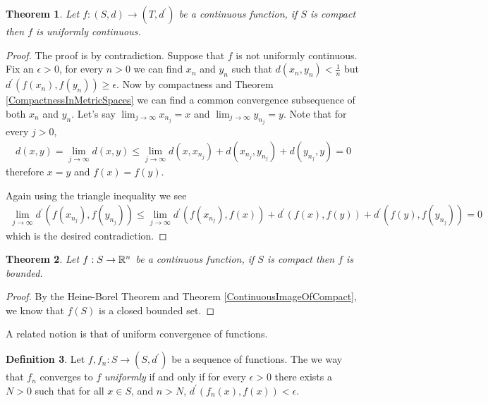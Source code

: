 \documentclass{amsart}
\newtheorem{thm}{Theorem}[section]
\theoremstyle{remark}
\theoremstyle{definition}
\newtheorem{defn}[thm]{Definition}
\begin{document}
\begin{thm}Let $f : (S,d) \to (T, d^\prime)$ be a continuous function, if $S$ is
  compact then $f$ is uniformly continuous.
\end{thm}
\begin{proof}
The proof is by contradiction.  Suppose that $f$ is not uniformly
continuous.  Fix an $\epsilon > 0$, for every $n > 0$ we can find
$x_n$ and $y_n$ such that $d(x_n, y_n) < \frac{1}{n}$ but
$d^\prime(f(x_n), f(y_n)) \geq \epsilon$.  Now by compactness and Theorem
\ref{CompactnessInMetricSpaces} we can find a
common convergence subsequence of both $x_n$ and $y_n$.  Let's say
$\lim_{j \to \infty} x_{n_j} = x$ and $\lim_{j \to \infty} y_{n_j} =
y$.  Note that for every $j>0$, 
\begin{align*}
d(x,y) = \lim_{j \to \infty } d(x,y)\leq \lim_{j \to \infty } d(x,
x_{n_j}) + d(x_{n_j}, y_{n_j}) + d(y_{n_j}, y) = 0
\end{align*}
therefore $x=y$ and $f(x)=f(y)$.  

Again using the triangle inequality we see
\begin{align*}
\lim_{j \to \infty} d^\prime(f(x_{n_j}), f(y_{n_j})) \leq \lim_{j \to \infty}
d^\prime(f(x_{n_j}), f(x)) + d^\prime(f(x), f(y)) + d^\prime(f(y), f(y_{n_j})) = 0
\end{align*}
which is the desired contradiction.
\end{proof}

\begin{thm}Let $f : S \to \mathbb{R}^n$ be a continuous function, if $S$ is
  compact then $f$ is bounded.
\end{thm}
\begin{proof}
By the Heine-Borel Theorem and Theorem \ref{ContinuousImageOfCompact}, we know that $f(S)$ is a closed bounded set.
\end{proof}

A related notion is that of uniform convergence of functions.
\begin{defn}Let $f, f_n : S \to (S, d^\prime)$ be a sequence
  of functions.  The we way that $f_n$ converges to $f$
  \emph{uniformly} if and only if for every $\epsilon > 0$ there
  exists a $N > 0$ such that for all $x \in S$, and $n > N$, $d^\prime(f_n(x), f(x)) < \epsilon$.
\end{defn}
\end{document}

